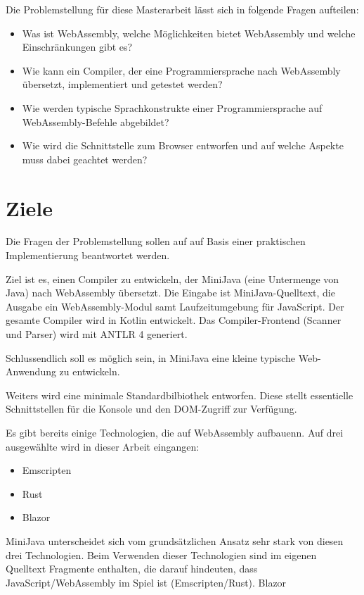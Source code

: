 Die Problemstellung für diese Masterarbeit lässt sich in folgende Fragen aufteilen:

\begin{itemize}
	\item Was ist WebAssembly, welche Möglichkeiten bietet WebAssembly und welche Einschränkungen gibt es?
	\item Wie kann ein Compiler, der eine Programmiersprache nach WebAssembly übersetzt, implementiert und getestet werden?
	\item Wie werden typische Sprachkonstrukte einer Programmiersprache auf Web\-Assem\-bly-Befehle abgebildet?
	\item Wie wird die Schnittstelle zum Browser entworfen und auf welche Aspekte muss dabei geachtet werden?
\end{itemize}

\section{Ziele}

Die Fragen der Problemstellung sollen auf auf Basis einer praktischen Implementierung beantwortet werden.

Ziel ist es, einen Compiler zu entwickeln, der MiniJava (eine Untermenge von Java) nach WebAssembly übersetzt. Die Eingabe ist MiniJava-Quelltext, die Ausgabe ein WebAssembly-Modul samt Laufzeitumgebung für JavaScript. Der gesamte Compiler wird in Kotlin entwickelt. Das Compiler-Frontend (Scanner und Parser) wird mit ANTLR 4 generiert.

Schlussendlich soll es möglich sein, in MiniJava eine kleine typische Web-Anwendung zu entwickeln.

Weiters wird eine minimale Standardbilbiothek entworfen. Diese stellt essentielle Schnittstellen für die Konsole und den DOM-Zugriff zur Verfügung.

Es gibt bereits einige Technologien, die auf WebAssembly aufbauenn. Auf drei ausgewählte wird in dieser Arbeit eingangen:
\begin{itemize}
    \item Emscripten \cite{Emscripten}
    \item Rust \cite{RustWasmWebsite}
    \item Blazor \cite{Blazor}
\end{itemize}
MiniJava unterscheidet sich vom grundsätzlichen Ansatz sehr stark von diesen drei Technologien. Beim Verwenden dieser Technologien sind im eigenen Quelltext Fragmente enthalten, die darauf hindeuten, dass JavaScript/WebAssembly im Spiel ist (Emscripten/Rust). Blazor 


